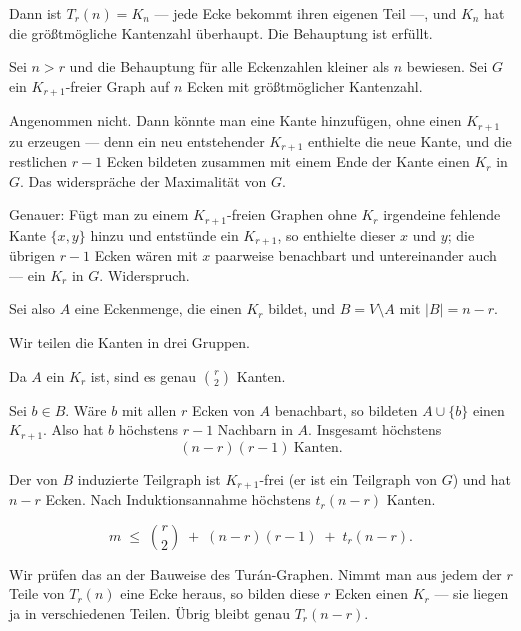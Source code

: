 \begin{merksatz}
Dann ist $T_r(n) = K_n$ --- jede Ecke bekommt ihren eigenen Teil ---, und $K_n$ hat die größtmögliche Kantenzahl überhaupt. Die Behauptung ist erfüllt.

Sei $n > r$ und die Behauptung für alle Eckenzahlen kleiner als $n$ bewiesen. Sei $G$ ein $K_{r+1}$-freier Graph auf $n$ Ecken mit größtmöglicher Kantenzahl.

Angenommen nicht. Dann könnte man eine Kante hinzufügen, ohne einen $K_{r+1}$ zu erzeugen --- denn ein neu entstehender $K_{r+1}$ enthielte die neue Kante, und die restlichen $r-1$ Ecken bildeten zusammen mit einem Ende der Kante einen $K_r$ in $G$. Das widerspräche der Maximalität von $G$.

Genauer: Fügt man zu einem $K_{r+1}$-freien Graphen ohne $K_r$ irgendeine fehlende Kante $\{x,y\}$ hinzu und entstünde ein $K_{r+1}$, so enthielte dieser $x$ und $y$; die übrigen $r-1$ Ecken wären mit $x$ paarweise benachbart und untereinander auch --- ein $K_r$ in $G$. Widerspruch.

Sei also $A$ eine Eckenmenge, die einen $K_r$ bildet, und $B = V \setminus A$ mit $|B| = n - r$.

Wir teilen die Kanten in drei Gruppen.

 Da $A$ ein $K_r$ ist, sind es genau $\binom{r}{2}$ Kanten.

 Sei $b \in B$. Wäre $b$ mit allen $r$ Ecken von $A$ benachbart, so bildeten $A \cup \{b\}$ einen $K_{r+1}$. Also hat $b$ höchstens $r-1$ Nachbarn in $A$. Insgesamt höchstens
\[ (n-r)(r-1) \ \text{Kanten}. \]

 Der von $B$ induzierte Teilgraph ist $K_{r+1}$-frei (er ist ein Teilgraph von $G$) und hat $n-r$ Ecken. Nach Induktionsannahme höchstens $t_r(n-r)$ Kanten.

\[ m \;\le\; \binom{r}{2} \;+\; (n-r)(r-1) \;+\; t_r(n-r) . \]

Wir prüfen das an der Bauweise des Turán-Graphen. Nimmt man aus jedem der $r$ Teile von $T_r(n)$ eine Ecke heraus, so bilden diese $r$ Ecken einen $K_r$ --- sie liegen ja in verschiedenen Teilen. Übrig bleibt genau $T_r(n-r)$.


\end{merksatz}
